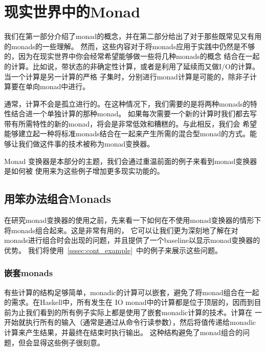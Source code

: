\section{现实世界中的Monad}
\indent{}我们在第一部分介绍了monad的概念，并在第二部分给出了对于那些既常见又有用的monads的一些理解。
然而，这些内容对于将monads应用于实践中仍然是不够的，因为在现实世界中你会经常希望能够做一些将几种monads的概念
结合在一起的计算。比如说，带状态的非确定性计算，或者是利用了延续而又做I/O的计算。当一个计算是另一计算的严格
子集时，分别进行monad计算是可能的，除非子计算要在单向monad中进行。

\indent{}通常，计算不会是孤立进行的。在这种情况下，我们需要的是将两种monads的特性结合进一个单独计算的那种monad。
如果每次需要一个新的计算时我们都去写带有所需特性的新的monad，将会是非常低效和糟糕的。与此相反，我们会
希望能够建立起一种将标准monads结合在一起来产生所需的混合型monad的方式。能够让我们做这件事的技术被称为monad变换器。

\indent{}Monad 变换器是本部分的主题，我们会通过重温前面的例子来看到monad变换器是如何被
使用来为这些例子增加更多现实功能的。

\subsection{用笨办法组合Monads}
\indent{}在研究monad变换器的使用之前，先来看一下如何在不使用monad变换器的情形下将monads组合起来。这是非常有用的，
它可以让我们更为深刻地了解在对monads进行组合时会出现的问题，并且提供了一个baseline以显示monad变换器的优势。
我们将使用~\ref{sssec:cont_example}~中的例子来展示这些问题。

\vspace{-0.5em}
\subsubsection{嵌套monads}\label{sssec:nested_monads}
\indent{}有些计算的结构足够简单，monadic的计算可以嵌套，避免了将monad组合在一起的需求。在Haskell中，所有发生在
IO monad中的计算都是位于顶层的，因而到目前为止我们看到的所有例子实际上都是使用了嵌套monadic计算的技术。计算在
一开始就执行所有的输入（通常是通过从命令行读参数），然后将值传递给monadic计算来产生结果，并最终在结束时执行输出。
这种结构避免了monad组合的问题，但会显得这些例子很刻意。

